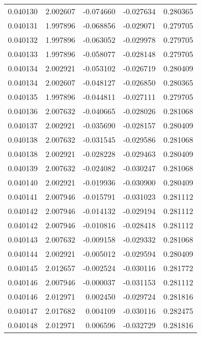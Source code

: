 \begin{tabular}{lrrrr}
0.040130    &  2.002607 & -0.074660 & -0.027634 &             0.280365 \\
0.040131    &  1.997896 & -0.068856 & -0.029071 &             0.279705 \\
0.040132    &  1.997896 & -0.063052 & -0.029978 &             0.279705 \\
0.040133    &  1.997896 & -0.058077 & -0.028148 &             0.279705 \\
0.040134    &  2.002921 & -0.053102 & -0.026719 &             0.280409 \\
0.040134    &  2.002607 & -0.048127 & -0.026850 &             0.280365 \\
0.040135    &  1.997896 & -0.044811 & -0.027111 &             0.279705 \\
0.040136    &  2.007632 & -0.040665 & -0.028026 &             0.281068 \\
0.040137    &  2.002921 & -0.035690 & -0.028157 &             0.280409 \\
0.040138    &  2.007632 & -0.031545 & -0.029586 &             0.281068 \\
0.040138    &  2.002921 & -0.028228 & -0.029463 &             0.280409 \\
0.040139    &  2.007632 & -0.024082 & -0.030247 &             0.281068 \\
0.040140    &  2.002921 & -0.019936 & -0.030900 &             0.280409 \\
0.040141    &  2.007946 & -0.015791 & -0.031023 &             0.281112 \\
0.040142    &  2.007946 & -0.014132 & -0.029194 &             0.281112 \\
0.040142    &  2.007946 & -0.010816 & -0.028418 &             0.281112 \\
0.040143    &  2.007632 & -0.009158 & -0.029332 &             0.281068 \\
0.040144    &  2.002921 & -0.005012 & -0.029594 &             0.280409 \\
0.040145    &  2.012657 & -0.002524 & -0.030116 &             0.281772 \\
0.040146    &  2.007946 & -0.000037 & -0.031153 &             0.281112 \\
0.040146    &  2.012971 &  0.002450 & -0.029724 &             0.281816 \\
0.040147    &  2.017682 &  0.004109 & -0.030116 &             0.282475 \\
0.040148    &  2.012971 &  0.006596 & -0.032729 &             0.281816 \\

\end{tabular}
